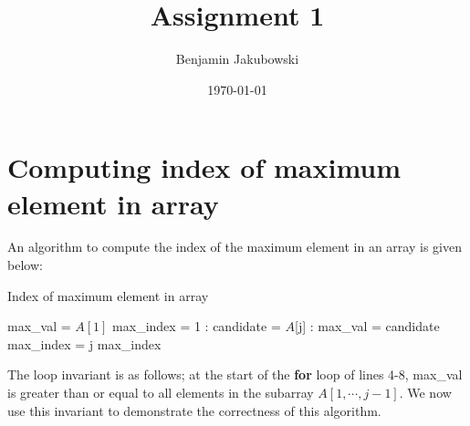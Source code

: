 \documentclass[paper=a4, fontsize=11pt]{scrartcl} %
\title{	Assignment 1}
\author{Benjamin Jakubowski} %
\date{\normalsize\today} %
\numberwithin{equation}{section} %
\numberwithin{figure}{section} %
\numberwithin{table}{section} %
\begin{document}
\maketitle %


\section{Computing index of maximum element in array}

An algorithm to compute the index of the maximum element in an array is given below:

\begin{algorithm}
\caption{Index of maximum element in array}
\label{maxel}
\begin{algorithmic}[1]
	\State max\_val = $A[1]$
	\State max\_index = 1
	:
		\State candidate = $A$[j]
		:
			\State max\_val = candidate
			\State max\_index = j
		\EndIf
	\EndFor
	\Return max\_index
\EndFunction
\end{algorithmic}
\end{algorithm}

The loop invariant is as follows; at the start of the \textbf{for} loop of lines 4-8, max\_val is greater than or equal to all elements in the subarray $A[1, \cdots, j - 1]$. We now use this invariant to demonstrate the correctness of this algorithm.
\end{document}
